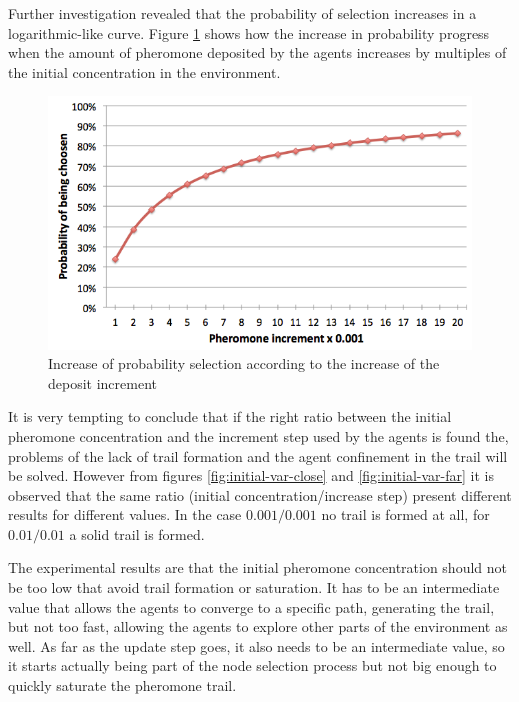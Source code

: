Further investigation revealed that the probability of selection increases in a logarithmic-like curve. Figure \ref{fig:prob-inc} shows how the increase in probability progress when the amount of pheromone deposited by the agents increases by multiples of the initial concentration in the environment.

\begin{figure}[H]
  \centering
  \includegraphics[width=0.6\linewidth]{gfx/probability-increase.png}
  \caption{Increase of probability selection according to the increase of the deposit increment}
  \label{fig:prob-inc}
\end{figure}

It is very tempting to conclude that if the right ratio between the initial pheromone concentration and the increment step used by the agents is found the, problems of the lack of trail formation and the agent confinement in the trail will be solved. However from figures \ref{fig:initial-var-close} and \ref{fig:initial-var-far} it is observed that the same ratio (initial concentration/increase step) present different results for different values. In the case $0.001/0.001$ no trail is formed at all, for $0.01/0.01$ a solid trail is formed. 

The experimental results are that the initial pheromone concentration should not be too low that avoid trail formation or saturation. It has to be an intermediate value that allows the agents to converge to a specific path, generating the trail, but not too fast, allowing the agents to explore other parts of the environment as well. As far as the update step goes, it also needs to be an intermediate value, so it starts actually being part of the node selection process but not big enough to quickly saturate the pheromone trail.


